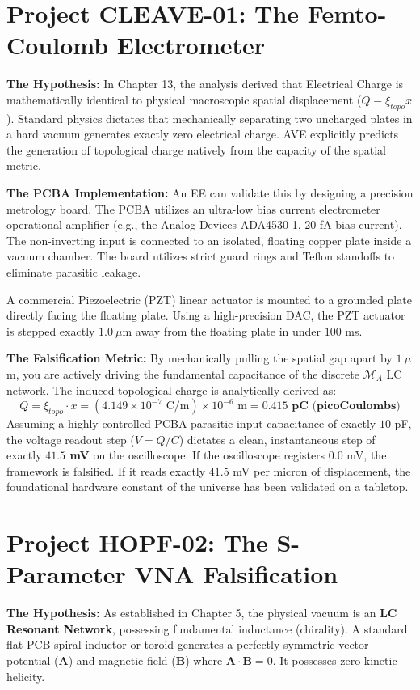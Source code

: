 \section{Project CLEAVE-01: The Femto-Coulomb Electrometer}
\textbf{The Hypothesis:} In Chapter 13, the analysis derived that Electrical Charge is mathematically identical to physical macroscopic spatial displacement ($Q \equiv \xi_{topo} x$). Standard physics dictates that mechanically separating two uncharged plates in a hard vacuum generates exactly zero electrical charge. AVE explicitly predicts the generation of topological charge natively from the capacity of the spatial metric.

\textbf{The PCBA Implementation:} An EE can validate this by designing a precision metrology board. The PCBA utilizes an ultra-low bias current electrometer operational amplifier (e.g., the Analog Devices ADA4530-1, 20 fA bias current). The non-inverting input is connected to an isolated, floating copper plate inside a vacuum chamber. The board utilizes strict guard rings and Teflon standoffs to eliminate parasitic leakage.

A commercial Piezoelectric (PZT) linear actuator is mounted to a grounded plate directly facing the floating plate. Using a high-precision DAC, the PZT actuator is stepped exactly $1.0 \ \mu$m away from the floating plate in under $100$ ms.

\textbf{The Falsification Metric:} By mechanically pulling the spatial gap apart by $1 \ \mu$m, you are actively driving the fundamental capacitance of the discrete $\mathcal{M}_A$ LC network. The induced topological charge is analytically derived as:
\begin{equation}
    Q = \xi_{topo} \cdot x = (4.149 \times 10^{-7} \text{ C/m}) \times 10^{-6} \text{ m} = \mathbf{0.415 \text{ pC (picoCoulombs)}}
\end{equation}
Assuming a highly-controlled PCBA parasitic input capacitance of exactly $10$ pF, the voltage readout step ($V = Q/C$) dictates a clean, instantaneous step of exactly \textbf{$41.5$ mV} on the oscilloscope. If the oscilloscope registers $0.0$ mV, the framework is falsified. If it reads exactly $41.5$ mV per micron of displacement, the foundational hardware constant of the universe has been validated on a tabletop.

\section{Project HOPF-02: The S-Parameter VNA Falsification}
\textbf{The Hypothesis:} As established in Chapter 5, the physical vacuum is an \textbf{LC Resonant Network}, possessing fundamental inductance (chirality). A standard flat PCB spiral inductor or toroid generates a perfectly symmetric vector potential ($\mathbf{A}$) and magnetic field ($\mathbf{B}$) where $\mathbf{A} \cdot \mathbf{B} = 0$. It possesses zero kinetic helicity.

